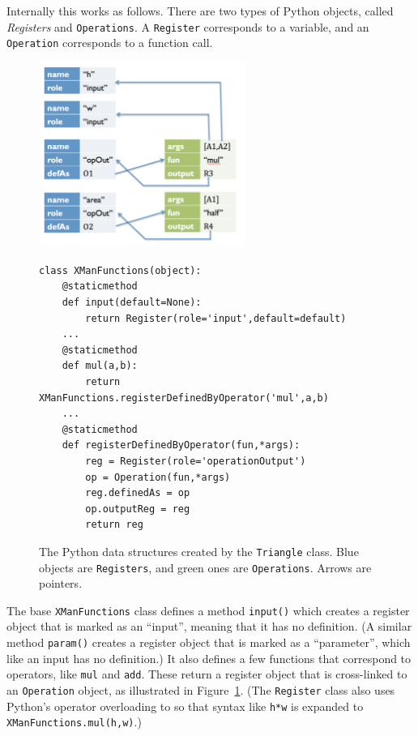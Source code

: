 \documentclass[12pt]{article}
\newcommand{\cd}[1]{\texttt{#1}}
\newcommand{\trm}[1]{\textit{#1}}
\begin{document}
Internally this works as follows.  There are two types of Python
objects, called \trm{Registers} and \cd{Operations}.  A \cd{Register}
corresponds to a variable, and an \cd{Operation} corresponds to a
function call.

\begin{figure}
\begin{center}
\includegraphics[width=0.6\textwidth]{./memory-layout.png}
\begin{small}
\begin{verbatim} 
class XManFunctions(object):
    @staticmethod
    def input(default=None):
        return Register(role='input',default=default)
    ...
    @staticmethod
    def mul(a,b):
        return XManFunctions.registerDefinedByOperator('mul',a,b)
    ...
    @staticmethod
    def registerDefinedByOperator(fun,*args):
        reg = Register(role='operationOutput')
        op = Operation(fun,*args)
        reg.definedAs = op
        op.outputReg = reg
        return reg
\end{verbatim} 
\end{small}
\end{center}
\label{fig:memory}
\caption{The Python data structures created by the \cd{Triangle}
  class.  Blue objects are \cd{Registers}, and green ones are
  \cd{Operations}.  Arrows are pointers.}
\end{figure}

The base \cd{XManFunctions} class defines a method \cd{input()} which
creates a register object that is marked as an ``input'', meaning that
it has no definition. (A similar method \cd{param()} creates a
register object that is marked as a ``parameter'', which like an input
has no definition.)  It also defines a few functions that correspond
to operators, like \cd{mul} and \cd{add}.  These return a register
object that is cross-linked to an \cd{Operation} object, as
illustrated in Figure~\ref{fig:memory}.  (The \cd{Register} class also
uses Python's operator overloading to so that syntax like \cd{h*w} is
  expanded to \cd{XManFunctions.mul(h,w)}.)
\end{document}
